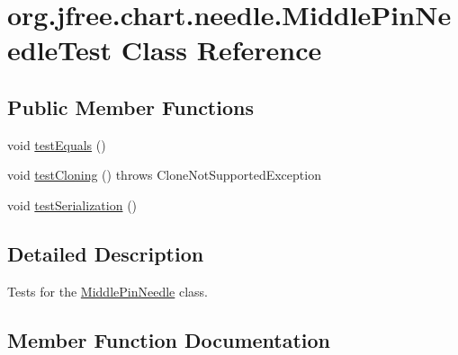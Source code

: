 \hypertarget{classorg_1_1jfree_1_1chart_1_1needle_1_1_middle_pin_needle_test}{}\section{org.\+jfree.\+chart.\+needle.\+Middle\+Pin\+Needle\+Test Class Reference}
\label{classorg_1_1jfree_1_1chart_1_1needle_1_1_middle_pin_needle_test}
\subsection*{Public Member Functions}
\begin{DoxyCompactItemize}
\item 
void \mbox{\hyperlink{classorg_1_1jfree_1_1chart_1_1needle_1_1_middle_pin_needle_test_ae74cf19ef9be37f8279b42fd8a0ade08}{test\+Equals}} ()
\item 
void \mbox{\hyperlink{classorg_1_1jfree_1_1chart_1_1needle_1_1_middle_pin_needle_test_aef7008a6cf83f304b0be529ed2db4145}{test\+Cloning}} ()  throws Clone\+Not\+Supported\+Exception 
\item 
void \mbox{\hyperlink{classorg_1_1jfree_1_1chart_1_1needle_1_1_middle_pin_needle_test_a8c8a993297b9009765a0da49df9b078c}{test\+Serialization}} ()
\end{DoxyCompactItemize}


\subsection{Detailed Description}
Tests for the \mbox{\hyperlink{classorg_1_1jfree_1_1chart_1_1needle_1_1_middle_pin_needle}{Middle\+Pin\+Needle}} class. 

\subsection{Member Function Documentation}
\mbox{\label{classorg_1_1jfree_1_1chart_1_1needle_1_1_middle_pin_needle_test_aef7008a6cf83f304b0be529ed2db4145}} 
